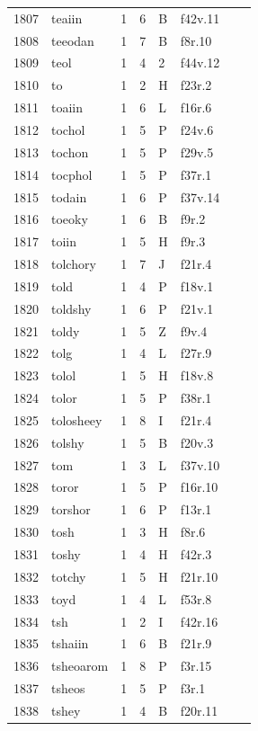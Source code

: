 \documentclass[11pt,a4paper]{article}
\begin{document}
\begin{landscape}
\begin{longtable}{@{}r>{\ttfamily}lrrl>{\ttfamily}l>{\raggedright\arraybackslash}p{80mm}>{\raggedright\arraybackslash}p{36mm}@{}}
1807 & teaiin & 1 & 6 & B & f42v.11 &  & \\
1808 & teeodan & 1 & 7 & B & f8r.10 &  & \\
1809 & teol & 1 & 4 & 2 & f44v.12 &  & \\
1810 & to & 1 & 2 & H & f23r.2 &  & \\
1811 & toaiin & 1 & 6 & L & f16r.6 &  & \\
1812 & tochol & 1 & 5 & P & f24v.6 &  & \\
1813 & tochon & 1 & 5 & P & f29v.5 &  & \\
1814 & tocphol & 1 & 5 & P & f37r.1 &  & \\
1815 & todain & 1 & 6 & P & f37v.14 &  & \\
1816 & toeoky & 1 & 6 & B & f9r.2 &  & \\
1817 & toiin & 1 & 5 & H & f9r.3 &  & \\
1818 & tolchory & 1 & 7 & J & f21r.4 &  & \\
1819 & told & 1 & 4 & P & f18v.1 &  & \\
1820 & toldshy & 1 & 6 & P & f21v.1 &  & \\
1821 & toldy & 1 & 5 & Z & f9v.4 &  & \\
1822 & tolg & 1 & 4 & L & f27r.9 &  & \\
1823 & tolol & 1 & 5 & H & f18v.8 &  & \\
1824 & tolor & 1 & 5 & P & f38r.1 &  & \\
1825 & tolosheey & 1 & 8 & I & f21r.4 &  & \\
1826 & tolshy & 1 & 5 & B & f20v.3 &  & \\
1827 & tom & 1 & 3 & L & f37v.10 &  & \\
1828 & toror & 1 & 5 & P & f16r.10 &  & \\
1829 & torshor & 1 & 6 & P & f13r.1 &  & \\
1830 & tosh & 1 & 3 & H & f8r.6 &  & \\
1831 & toshy & 1 & 4 & H & f42r.3 &  & \\
1832 & totchy & 1 & 5 & H & f21r.10 &  & \\
1833 & toyd & 1 & 4 & L & f53r.8 &  & \\
1834 & tsh & 1 & 2 & I & f42r.16 &  & \\
1835 & tshaiin & 1 & 6 & B & f21r.9 &  & \\
1836 & tsheoarom & 1 & 8 & P & f3r.15 &  & \\
1837 & tsheos & 1 & 5 & P & f3r.1 &  & \\
1838 & tshey & 1 & 4 & B & f20r.11 &  & \\

\end{longtable}
\end{landscape}
\end{document}
